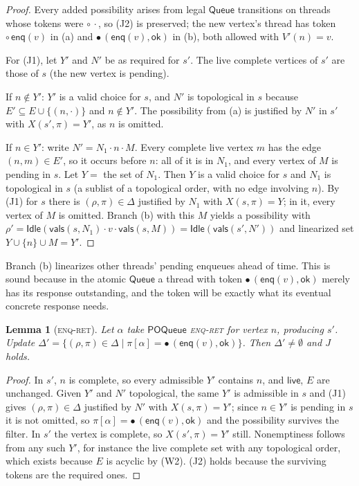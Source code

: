 \documentclass[11pt]{article}
\newtheorem{lemma}{Lemma}[section]
\theoremstyle{definition}
\theoremstyle{remark}
\newcommand{\Idle}{\mathsf{Idle}}
\newcommand{\Enq}{\mathsf{enq}}
\newcommand{\ok}{\mathsf{ok}}
\newcommand{\live}{\mathsf{live}}
\newcommand{\vals}{\mathsf{vals}}
\newcommand{\poss}{\Delta}
\newcommand{\abst}{\rho}
\newcommand{\tokens}{\pi}
\newcommand{\POQueue}{\mathsf{POQueue}}
\newcommand{\Queue}{\mathsf{Queue}}
\newcommand{\tok}[1]{\circ\,#1}
\newcommand{\done}[2]{\bullet\,(#1,#2)}
\begin{document}
\begin{proof}
Every added possibility arises from legal $\Queue$ transitions on threads
whose tokens were $\tok{\cdot}$, so (J2) is preserved; the new vertex's
thread has token $\tok{\Enq(v)}$ in (a) and $\done{\Enq(v)}{\ok}$ in (b),
both allowed with $V'(n) = v$.

For (J1), let $Y'$ and $N'$ be as required for $s'$.  The live complete
vertices of $s'$ are those of $s$ (the new vertex is pending).

If $n \notin Y'$: $Y'$ is a valid choice for $s$, and $N'$ is topological
in $s$ because $E' \subseteq E \cup \{(n, \cdot)\}$ and $n \notin Y'$.
The possibility from (a) is justified by $N'$ in $s'$ with $X(s', \tokens) =
Y'$, as $n$ is omitted.

If $n \in Y'$: write $N' = N_1 \cdot n \cdot M$.  Every complete live vertex
$m$ has the edge $(n, m) \in E'$, so it occurs before $n$: all of it is in
$N_1$, and every vertex of $M$ is pending in $s$.  Let $Y = $ the set of
$N_1$.  Then $Y$ is a valid choice for $s$ and $N_1$ is topological in $s$
(a sublist of a topological order, with no edge involving $n$).  By (J1)
for $s$ there is $(\abst, \tokens) \in \poss$ justified by $N_1$ with
$X(s, \tokens) = Y$; in it, every vertex of $M$ is omitted.  Branch (b) with
this $M$ yields a possibility with $\abst' = \Idle(\vals(s,N_1) \cdot v \cdot
\vals(s, M)) = \Idle(\vals(s', N'))$ and linearized set $Y \cup \{n\} \cup M
= Y'$.
\end{proof}

Branch (b) linearizes other threads' pending enqueues ahead of time.  This
is sound because in the atomic $\Queue$ a thread with token
$\done{\Enq(v)}{\ok}$ merely has its response outstanding, and the token will
be exactly what its eventual concrete response needs.

\begin{lemma}[\textsc{enq-ret}]\label{lem:l2-enqret}
Let $\alpha$ take $\POQueue$ \textsc{enq-ret} for vertex $n$, producing
$s'$.  Update $\poss' = \{(\abst, \tokens) \in \poss \mid \tokens[\alpha] =
\done{\Enq(v)}{\ok}\}$.  Then $\poss' \ne \emptyset$ and $J$ holds.
\end{lemma}

\begin{proof}
In $s'$, $n$ is complete, so every admissible $Y'$ contains $n$, and
$\live$, $E$ are unchanged.  Given $Y'$ and $N'$ topological, the same $Y'$
is admissible in $s$ and (J1) gives $(\abst,\tokens) \in \poss$ justified by
$N'$ with $X(s,\tokens) = Y'$; since $n \in Y'$ is pending in $s$ it is not
omitted, so $\tokens[\alpha] = \done{\Enq(v)}{\ok}$ and the possibility
survives the filter.  In $s'$ the vertex is complete, so $X(s', \tokens) =
Y'$ still.  Nonemptiness follows from any such $Y'$, for instance the live
complete set with any topological order, which exists because $E$ is acyclic
by (W2).  (J2) holds because the surviving tokens are the required ones.
\end{proof}
\end{document}
